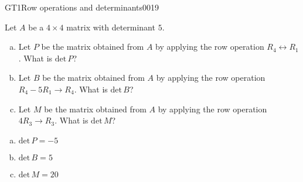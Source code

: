\begin{exercise}{GT1}{Row operations and determinants}{0019} 
\begin{exerciseStatement} 

Let \(A\) be a \(4 \times 4\) matrix with determinant \(5\).

 

\begin{enumerate}[(a)]
\item Let \(P\) be the matrix obtained from \(A\) by applying the row operation \(R_4 \leftrightarrow R_1\). What is \(\mathrm{det}\,P\)?
\item Let \(B\) be the matrix obtained from \(A\) by applying the row operation \(R_4 - 5 R_1 \to R_4\). What is \(\mathrm{det}\,B\)?
\item Let \(M\) be the matrix obtained from \(A\) by applying the row operation \(4 R_3 \to R_3\). What is \(\mathrm{det}\,M\)?
\end{enumerate}

     \end{exerciseStatement}
 \begin{exerciseAnswer} 

\begin{enumerate}[(a)]
\item \(\mathrm{det}\,P=-5\)
\item \(\mathrm{det}\,B=5\)
\item \(\mathrm{det}\,M=20\)
\end{enumerate}

     \end{exerciseAnswer}
 \end{exercise}



